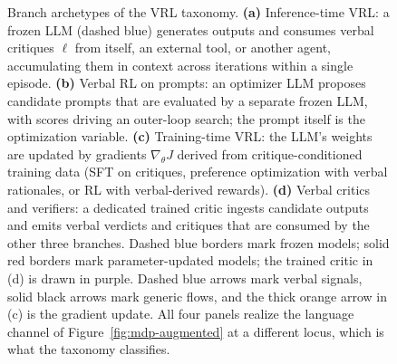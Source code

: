 \begin{figure}[!t]
\begin{tikzpicture}
\end{tikzpicture}
\caption{Branch archetypes of the VRL taxonomy.
\textbf{(a)} Inference-time VRL: a frozen LLM (dashed blue) generates outputs and consumes verbal critiques $\ell$ from itself, an external tool, or another agent, accumulating them in context across iterations within a single episode.
\textbf{(b)} Verbal RL on prompts: an optimizer LLM proposes candidate prompts that are evaluated by a separate frozen LLM, with scores driving an outer-loop search; the prompt itself is the optimization variable.
\textbf{(c)} Training-time VRL: the LLM's weights are updated by gradients $\nabla_\theta J$ derived from critique-conditioned training data (SFT on critiques, preference optimization with verbal rationales, or RL with verbal-derived rewards).
\textbf{(d)} Verbal critics and verifiers: a dedicated trained critic ingests candidate outputs and emits verbal verdicts and critiques that are consumed by the other three branches.
Dashed blue borders mark frozen models; solid red borders mark parameter-updated models; the trained critic in (d) is drawn in purple. Dashed blue arrows mark verbal signals, solid black arrows mark generic flows, and the thick orange arrow in (c) is the gradient update. All four panels realize the language channel of Figure~\ref{fig:mdp-augmented} at a different locus, which is what the taxonomy classifies.}
\label{fig:branch-archetypes}
\end{figure}



